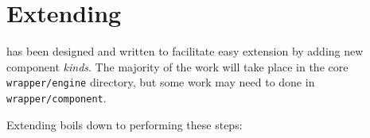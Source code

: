 %
%
%
%
\chapter{Extending \lmsbw}\label{chap:extending}

\lmsbw has been designed and written to facilitate easy extension by
adding new component \emph{kinds}.  The majority of the work will take
place in the core \texttt{wrapper/engine} directory, but some work may
need to done in \texttt{wrapper/component}.

Extending boils down to performing these steps:

